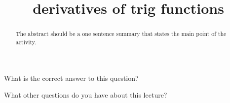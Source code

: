 \documentclass{ximera}
\title{derivatives of trig functions}
\begin{document}
\begin{abstract}
  The abstract should be a one sentence summary that states the main point of the activity.
\end{abstract}

\maketitle

\begin{question}
  What is the correct answer to this question?

  \begin{solution}
    \begin{multiple-choice}
    \end{multiple-choice}  
  \end{solution}
\end{question}

What other questions do you have about this lecture?
\begin{free-response}
\end{free-response}
\end{document}
